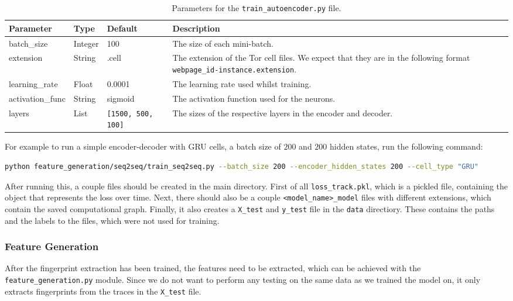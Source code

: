 \begin{table}[ht]
  \centering
  \begin{tabular}{ l | l | l | p{} }
    \textbf{Parameter} & \textbf{Type} & \textbf{Default} & \textbf{Description} \\ \hline \hline
    batch\_size & Integer & 100 & The size of each mini-batch. \\ \hline
    extension & String & .cell & The extension of the Tor cell files. We expect that they are in the following format \texttt{webpage\_id-instance.extension}. \\ \hline
    learning\_rate & Float & 0.0001 & The learning rate used whilst training. \\ \hline
    activation\_func & String & sigmoid & The activation function used for the neurons. \\ \hline
    layers & List & \texttt{[1500, 500, 100]} & The sizes of the respective layers in the encoder and decoder.
  \end{tabular}
  \caption{Parameters for the \texttt{train\_autoencoder.py} file.}
\end{table}

\noindent
For example to run a simple encoder-decoder with GRU cells, a batch size of $200$ and $200$ hidden states, run the following command:
\begin{lstlisting}[language=Bash]
python feature_generation/seq2seq/train_seq2seq.py --batch_size 200 --encoder_hidden_states 200 --cell_type "GRU"
\end{lstlisting}

After running this, a couple files should be created in the main directory.
First of all \texttt{loss\_track.pkl}, which is a pickled file, containing the object that represents the loss over time.
Next, there should also be a couple \texttt{<model\_name>\_model} files with different extensions, which contain the saved computational graph.
Finally, it also creates a \texttt{X\_test} and \texttt{y\_test} file in the \texttt{data} directiory.
These contains the paths and the labels to the files, which were not used for training.

\newpage

\subsubsection{Feature Generation}

After the fingerprint extraction has been trained, the features need to be extracted, which can be achieved with the \texttt{feature\_generation.py} module.
Since we do not want to perform any testing on the same data as we trained the model on, it only extracts fingerprints from the traces in the \texttt{X\_test} file.

